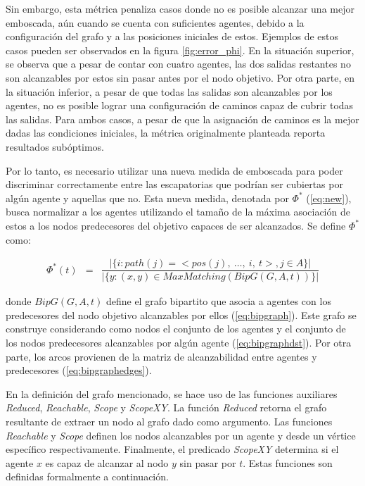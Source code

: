 

Sin embargo, esta m\'etrica penaliza casos donde no es posible alcanzar
una mejor emboscada, a\'un cuando se cuenta con suficientes agentes, debido
a la configuraci\'on del grafo y a las posiciones iniciales de estos. 
Ejemplos de estos casos pueden ser observados en la figura \ref{fig:error_phi}. En
la situaci\'on superior, se observa que a pesar de contar con cuatro agentes,
las dos salidas restantes no son alcanzables por estos sin pasar antes por el
nodo objetivo. Por otra parte, en la situaci\'on inferior, a pesar de que todas
las salidas son alcanzables por los agentes, no es posible lograr una
configuraci\'on de caminos capaz de cubrir todas las salidas. Para ambos
casos, a pesar de que la asignaci\'on de caminos es la mejor dadas las
condiciones iniciales, la m\'etrica originalmente planteada reporta resultados
sub\'optimos.



Por lo tanto, es necesario utilizar una nueva medida de emboscada
para poder discriminar correctamente entre las escapatorias que podr\'ian
ser cubiertas por alg\'un agente y aquellas que no. Esta nueva medida,
denotada por $\Phi^*$ (\ref{eq:new}), busca normalizar a los agentes utilizando
el tamaño de la m\'axima asociaci\'on de estos a los nodos predecesores
del objetivo capaces de ser alcanzados. Se define $\Phi^*$ como:

\begin{small}
\begin{eqnarray}
 \Phi^*(t) &=& 
\dfrac{|\{ i : path(j) = <pos(j),\ \ldots,\ i,\ t>, j \in A\}|}
	  {|\{ y : (x,y) \in MaxMatching(BipG(G,A,t))\}|}
\label{eq:new}
\end{eqnarray}
\end{small}

\noindent
donde $BipG(G,A,t)$ define el grafo bipartito que asocia a agentes con
los predecesores del nodo objetivo alcanzables por ellos (\ref{eq:bipgraph}).
Este grafo se construye considerando como nodos el conjunto
de los agentes y el conjunto de los nodos predecesores alcanzables por alg\'un
agente (\ref{eq:bipgraphdst}). Por otra parte, los arcos provienen
de la matriz de alcanzabilidad entre agentes y predecesores (\ref{eq:bipgraphedges}).

En la definici\'on del grafo mencionado, se hace uso de las funciones
auxiliares \textit{Reduced}, \textit{Reachable}, \textit{Scope} y
\textit{ScopeXY}. La funci\'on
\textit{Reduced} retorna el grafo resultante de extraer un nodo al grafo
dado como argumento. Las funciones \textit{Reachable} y \textit{Scope}
definen los nodos alcanzables por un agente y desde un v\'ertice espec\'ifico
respectivamente. Finalmente, el predicado \textit{ScopeXY} determina 
si el agente $x$ es capaz de alcanzar al nodo $y$ sin pasar por $t$.
Estas funciones son definidas formalmente a continuaci\'on.

